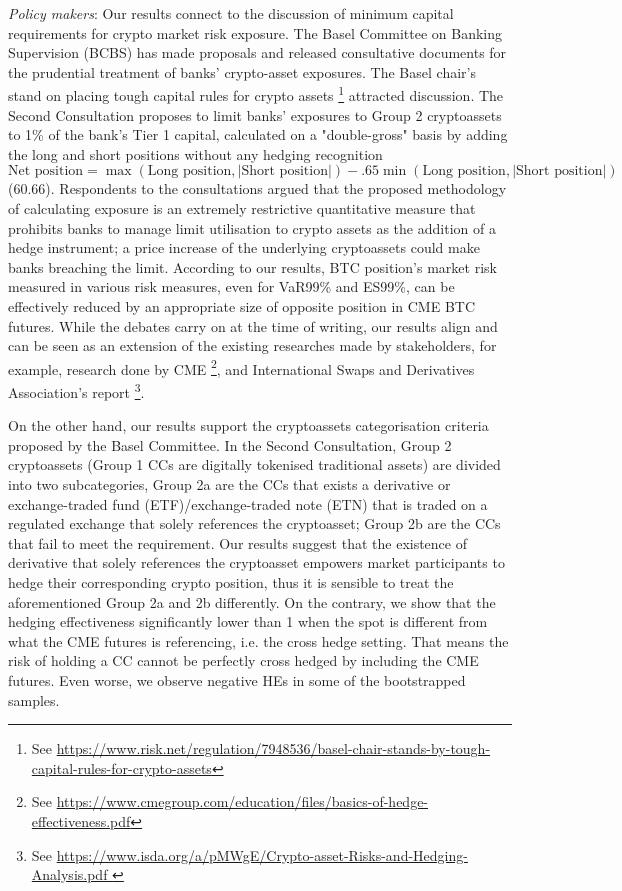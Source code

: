 \textit{Policy makers}:
Our results connect to the discussion of minimum capital requirements for crypto market risk exposure.
The Basel Committee on Banking Supervision (BCBS) has made proposals and released consultative documents for the prudential treatment of banks' crypto-asset exposures.
The Basel chair's stand on placing tough capital rules for crypto assets \footnote{See \url{https://www.risk.net/regulation/7948536/basel-chair-stands-by-tough-capital-rules-for-crypto-assets}} attracted discussion.
The Second Consultation proposes to limit banks' exposures to Group 2 cryptoassets to 1\% of the bank's Tier 1 capital,
calculated on a "double-gross" basis by adding the long and short positions without any hedging recognition
$\text{Net position} = \max \left(
\text{Long position}, |\text{Short position}|
\right)
- .65 \min\left(
\text{Long position}, |\text{Short position}|
\right)$ (60.66).
Respondents to the consultations argued that the proposed methodology of calculating exposure is an extremely restrictive quantitative measure that prohibits banks to manage limit utilisation to crypto assets as the addition of a hedge instrument;
a price increase of the underlying cryptoassets could make banks breaching the limit.
According to our results, BTC position's market risk measured in various risk measures,
even for VaR99\% and ES99\%, can be effectively reduced by an appropriate size of opposite position in CME BTC futures.
While the debates carry on at the time of writing, our results align and can be seen as an extension of the existing researches made by stakeholders,
for example, research done by CME \footnote{See \url{https://www.cmegroup.com/education/files/basics-of-hedge-effectiveness.pdf}},
and International Swaps and Derivatives Association's report \footnote{See \url{https://www.isda.org/a/pMWgE/Crypto-asset-Risks-and-Hedging-Analysis.pdf }}.

On the other hand, our results support the cryptoassets categorisation criteria proposed by the Basel Committee.
In the Second Consultation, Group 2 cryptoassets (Group 1 CCs are digitally tokenised traditional assets) are divided into two subcategories,
Group 2a are the CCs that exists a derivative or exchange-traded fund (ETF)/exchange-traded note (ETN) that is traded on a regulated exchange that solely references the cryptoasset;
Group 2b are the CCs that fail to meet the requirement.
Our results suggest that the existence of derivative that solely references the cryptoasset empowers market participants to hedge their corresponding crypto position,
thus it is sensible to treat the aforementioned Group 2a and 2b differently.
On the contrary, we show that the hedging effectiveness significantly lower than 1 when the spot is different from what the CME futures is referencing, i.e. the cross hedge setting.
That means the risk of holding a CC cannot be perfectly cross hedged by including the CME futures.
Even worse, we observe negative HEs in some of the bootstrapped samples.


